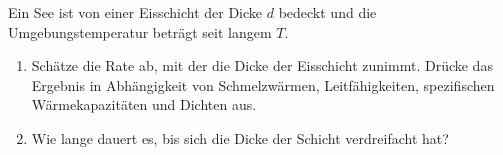 \begin{Exercise}[label = Zugefrorener See, origin = {3. Runde zur 43. IPhO 2012}, title = Zugefrorener See, difficulty = 3]
Ein See ist von einer Eisschicht der Dicke $d$ bedeckt und die Umgebungstemperatur beträgt seit langem $T$.
\begin{enumerate}
\item Schätze die Rate ab, mit der die Dicke der Eisschicht zunimmt. Drücke das Ergebnis in Abhängigkeit von Schmelzwärmen, Leitfähigkeiten, spezifischen Wärmekapazitäten und Dichten aus.
\item Wie lange dauert es, bis sich die Dicke der Schicht verdreifacht hat? 
\end{enumerate}    	
\end{Exercise}
